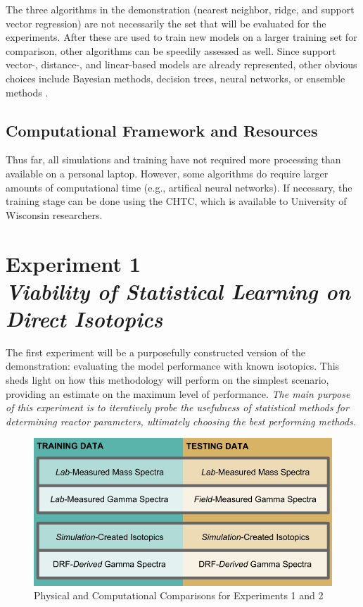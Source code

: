 The three algorithms in the demonstration (nearest neighbor, ridge, and support
vector regression) are not necessarily the set that will be evaluated for the
experiments. After these are used to train new models on a larger training set
for comparison, other algorithms can be speedily assessed as well.  Since
support vector-, distance-, and linear-based models are already represented,
other obvious choices include Bayesian methods, decision trees, neural
networks, or ensemble methods \cite{elements_stats}. 

\subsection*{Computational Framework and Resources}

Thus far, all simulations and training have not required more processing than
available on a personal laptop. However, some algorithms do require larger
amounts of computational time (e.g., artifical neural networks).  If necessary,
the training stage can be done using the \gls{CHTC}, which is available to
University of Wisconsin researchers. 

\section[Experiment 1: Direct Isotopics]{Experiment 1\\ 
\large{\textit{Viability of Statistical Learning on Direct Isotopics}}}
\label{sec:exp1}

The first experiment will be a purposefully constructed version of the
demonstration: evaluating the model performance with known isotopics.  This
sheds light on how this methodology will perform on the simplest scenario,
providing an estimate on the maximum level of performance.  \textit{The main
purpose of this experiment is to iteratively probe the usefulness of
statistical methods for determining reactor parameters, ultimately choosing the 
best performing methods.}

\begin{figure}[!htb]
    \centering
    \includegraphics[width=\linewidth]{./chapters/proposal/proposal.png}
    \caption{Physical and Computational Comparisons for Experiments 1 and 2}
    \label{fig:proposal}
\end{figure}

